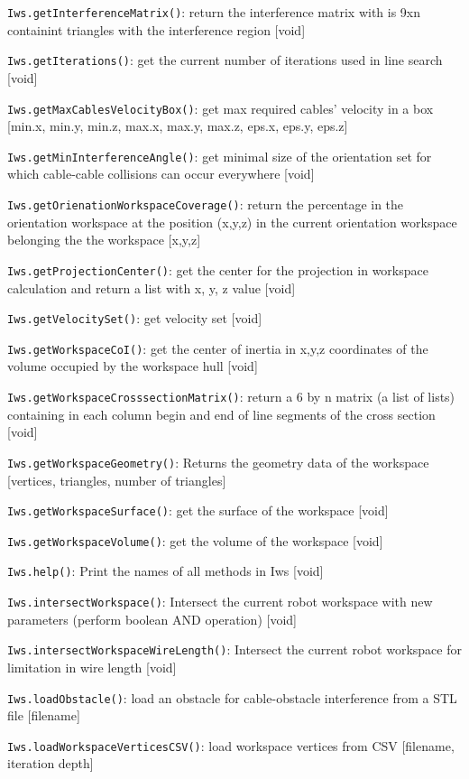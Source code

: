 \documentclass[11pt,a4paper,onepage,openany]{book}
\begin{document}
\texttt{Iws.getInterferenceMatrix()}: return the interference matrix with is 9xn containint triangles with the interference region [void]

\texttt{Iws.getIterations()}: get the current number of iterations used in line search [void]

\texttt{Iws.getMaxCablesVelocityBox()}: get max required cables' velocity in a box [min.x, min.y, min.z, max.x, max.y, max.z, eps.x, eps.y, eps.z]

\texttt{Iws.getMinInterferenceAngle()}: get minimal size of the orientation set for which cable-cable collisions can occur everywhere [void]

\texttt{Iws.getOrienationWorkspaceCoverage()}: return the percentage in the orientation workspace at the position (x,y,z) in the current orientation workspace belonging the the workspace [x,y,z]

\texttt{Iws.getProjectionCenter()}: get the center for the projection in workspace calculation and return a list with x, y, z value [void]

\texttt{Iws.getVelocitySet()}: get velocity set [void]

\texttt{Iws.getWorkspaceCoI()}: get the center of inertia in x,y,z coordinates of the volume occupied by the workspace hull [void]

\texttt{Iws.getWorkspaceCrosssectionMatrix()}: return a 6 by n matrix (a list of lists) containing in each column begin and end of line segments of the cross section [void]

\texttt{Iws.getWorkspaceGeometry()}: Returns the geometry data of the workspace [vertices, triangles, number of triangles]

\texttt{Iws.getWorkspaceSurface()}: get the surface of the workspace [void]

\texttt{Iws.getWorkspaceVolume()}: get the volume of the workspace [void]

\texttt{Iws.help()}: Print the names of all methods in Iws [void]

\texttt{Iws.intersectWorkspace()}: Intersect the current robot workspace with new parameters (perform boolean AND operation) [void]

\texttt{Iws.intersectWorkspaceWireLength()}: Intersect the current robot workspace for limitation in wire length [void]

\texttt{Iws.loadObstacle()}: load an obstacle for cable-obstacle interference from a STL file [filename]

\texttt{Iws.loadWorkspaceVerticesCSV()}: load workspace vertices from CSV [filename, iteration depth]
\end{document}

